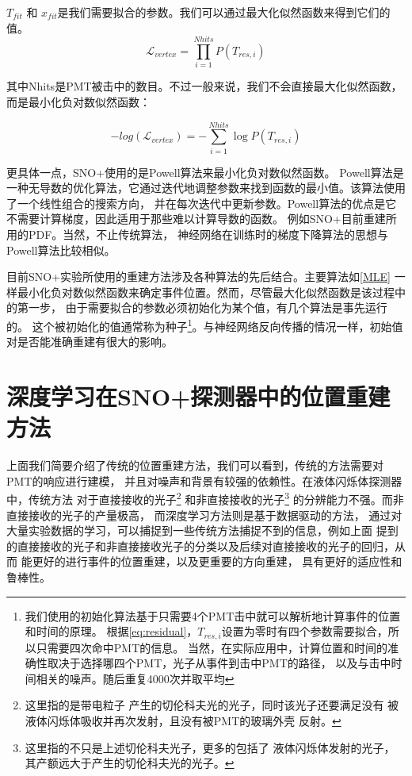 $T_{fit}$ 和 $x_{fit}$是我们需要拟合的参数。我们可以通过最大化似然函数来得到它们的值。
\begin{equation}
\mathcal{L}_{vertex} = \prod_{i=1}^{Nhits} P(T_{res,i})
\end{equation}

其中Nhits是PMT被击中的数目。不过一般来说，我们不会直接最大化似然函数，而是最小化负对数似然函数：

\begin{equation}
-log(\mathcal{L}_{vertex}) = -\sum_{i=1}^{Nhits} \log P(T_{res,i})
\label{MLE}
\end{equation}

更具体一点，SNO+使用的是Powell算法\cite{powell1964efficient}来最小化负对数似然函数。
Powell算法是一种无导数的优化算法，它通过迭代地调整参数来找到函数的最小值。该算法使用了一个线性组合的搜索方向，
并在每次迭代中更新参数。Powell算法的优点是它不需要计算梯度，因此适用于那些难以计算导数的函数。
例如SNO+目前重建所用的PDF。当然，不止传统算法，
神经网络在训练时的梯度下降算法的思想与Powell算法比较相似。

目前SNO+实验所使用的重建方法涉及各种算法的先后结合\cite{Allega_2024}。主要算法如\ref{MLE}
一样最小化负对数似然函数来确定事件位置。然而，尽管最大化似然函数是该过程中的第一步，
由于需要拟合的参数必须初始化为某个值，有几个算法是事先运行的。
这个被初始化的值通常称为种子\footnote{我们使用的初始化算法基于只需要4个PMT击中就可以解析地计算事件的位置和时间的原理。
根据\ref{eq:residual}，$T_{res,i}$设置为零时有四个参数需要拟合，所以只需要四次命中PMT的信息。
当然，在实际应用中，计算位置和时间的准确性取决于选择哪四个PMT，光子从事件到击中PMT的路径，
以及与击中时间相关的噪声。随后重复4000次并取平均}。与神经网络反向传播的情况一样，初始值对是否能准确重建有很大的影响。



\section{深度学习在SNO+探测器中的位置重建方法}\label{sec:dl_reconstruction}

上面我们简要介绍了传统的位置重建方法，我们可以看到，传统的方法需要对PMT的响应进行建模，
并且对噪声和背景有较强的依赖性。在液体闪烁体探测器中，传统方法
对于直接接收的光子\footnote{这里指的是带电粒子
产生的切伦科夫光的光子，同时该光子还要满足没有
被液体闪烁体吸收并再次发射，且没有被PMT的玻璃外壳
反射。}
和非直接接收的光子\footnote{这里指的不只是上述切伦科夫光子，更多的包括了
液体闪烁体发射的光子，其产额远大于产生的切伦科夫光的光子。}
的分辨能力不强。而非直接接收的光子的产量极高，
而深度学习方法则是基于数据驱动的方法，
通过对大量实验数据的学习，可以捕捉到一些传统方法捕捉不到的信息，例如上面
提到的直接接收的光子和非直接接收光子的分类以及后续对直接接收的光子的回归，从而
能更好的进行事件的位置重建，以及更重要的方向重建，
具有更好的适应性和鲁棒性。

